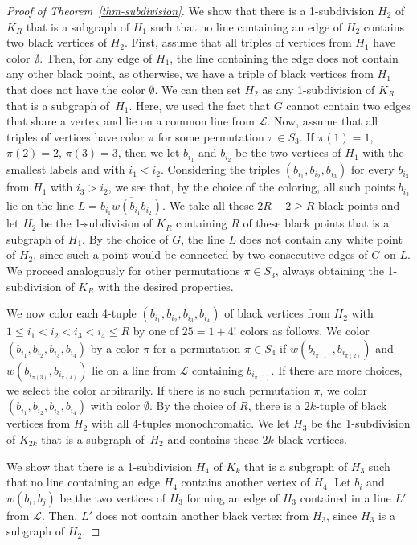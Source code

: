 \documentclass{article}
\begin{document}
\begin{proof}[Proof of Theorem~\ref{thm-subdivision}]
We show that there is a 1-subdivision $H_2$ of $K_R$ that is a subgraph of $H_1$ such that no line containing an edge of $H_2$ contains two black vertices of $H_2$.
First, assume that all triples of vertices from $H_1$ have color $\emptyset$.
Then, for any edge of $H_1$, the line containing the edge does not contain any other black point, as otherwise, we have a triple of black vertices from $H_1$ that does not have the color $\emptyset$.
We can then set $H_2$ as any 1-subdivision of $K_R$ that is a subgraph of~$H_1$.
Here, we used the fact that $G$ cannot contain two edges that share a vertex and lie on a common line from $\mathcal{L}$.
Now, assume that all triples of vertices have color $\pi$ for some permutation $\pi \in S_3$.
If $\pi(1)=1$, $\pi(2)=2$, $\pi(3)=3$, then we let $b_{i_1}$ and $b_{i_2}$ be the two vertices of $H_1$ with the smallest labels and with $i_1<i_2$.
Considering the triples $(b_{i_1},b_{i_2},b_{i_3})$ for every $b_{i_3}$ from $H_1$ with $i_3 > i_2$, we see that, by the choice of the coloring, all such points $b_{i_3}$ lie on the line $L=\overline{b_{i_1}w(b_{i_1}b_{i_2})}$. 
We take all these $2R-2 \geq R$ black points and let $H_2$ be the 1-subdivision of $K_R$ containing $R$ of these black points that is a subgraph of $H_1$.
By the choice of $G$, the line $L$ does not contain any white point of $H_2$, since such a point would be connected by two consecutive edges of $G$ on $L$.
We proceed analogously for other permutations $\pi \in S_3$, always obtaining the 1-subdivision of $K_R$ with the desired properties.

We now color each 4-tuple $(b_{i_1},b_{i_2},b_{i_3},b_{i_4})$ of black vertices from $H_2$ with $1 \leq i_1 < i_2 < i_3 < i_4 \leq R$ by one of $25=1+4!$ colors as follows.
We color $(b_{i_1},b_{i_2},b_{i_3},b_{i_4})$ by a color $\pi$ for a permutation $\pi \in S_4$ if $w(b_{i_{\pi(1)}},b_{i_{\pi(2)}})$ and $w(b_{i_{\pi(3)}},b_{i_{\pi(4)}})$ lie on a line from $\mathcal{L}$ containing $b_{i_{\pi(1)}}$.
If there are more choices, we select the color arbitrarily.
If there is no such permutation $\pi$, we color $(b_{i_1},b_{i_2},b_{i_3},b_{i_4})$ with color $\emptyset$.
By the choice of $R$, there is a $2k$-tuple of black vertices from $H_2$ with all 4-tuples monochromatic.
We let $H_3$ be the 1-subdivision of $K_{2k}$ that is a subgraph of~$H_2$ and contains these $2k$ black vertices.

We show that there is a 1-subdivision $H_4$ of $K_k$ that is a subgraph of $H_3$ such that no line containing an edge $H_4$ contains another vertex of $H_4$.
Let $b_i$ and $w(b_i,b_j)$ be the two vertices of $H_3$ forming an edge of $H_3$ contained in a line $L'$ from $\mathcal{L}$.
Then, $L'$ does not contain another black vertex from $H_3$, since $H_3$ is a subgraph of $H_2$.


\end{proof}
\end{document}
